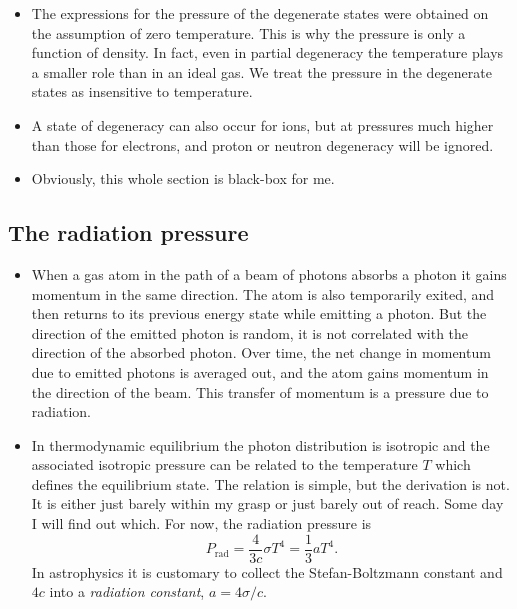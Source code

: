 \documentclass[10pt,amsmath,amssymb,aps,pra]{revtex4-2}
\newcommand{\sub}[1]{_{\text{#1}}}
\begin{document}
\begin{itemize}
\item The expressions for the pressure of the degenerate states were obtained on
the assumption of zero temperature. This is why the pressure is only a function
of density. In fact, even in partial degeneracy the temperature plays a smaller
role than in an ideal gas. We treat the pressure in the degenerate states as
insensitive to temperature.

\item A state of degeneracy can also occur for ions, but at pressures much
higher than those for electrons, and proton or neutron degeneracy will be
ignored.

\item Obviously, this whole section is black-box for me.
\end{itemize}

\subsection{The radiation pressure}
\begin{itemize}
\item When a gas atom in the path of a beam of photons absorbs a photon it gains
momentum in the same direction. The atom is also temporarily exited, and then
returns to its previous energy state while emitting a photon. But the direction
of the emitted photon is random, it is not correlated with the direction of the
absorbed photon. Over time, the net change in momentum due to emitted photons is
averaged out, and the atom gains momentum in the direction of the beam. This
transfer of momentum is a pressure due to radiation.

\item In thermodynamic equilibrium the photon distribution is isotropic and the
associated isotropic pressure can be related to the temperature $T$ which
defines the equilibrium state. The relation is simple, but the derivation is
not. It is either just barely within my grasp or just barely out of reach. Some
day I will find out which. For now, the radiation pressure is
\begin{equation}
P\sub{rad} = \frac{4}{3c}\sigma{}T^4 = \frac{1}{3}aT^4.
\end{equation}
In astrophysics it is customary to collect the Stefan-Boltzmann constant and
$4c$ into a \emph{radiation constant}, $a=4\sigma/c$.
\end{itemize}
\end{document}
